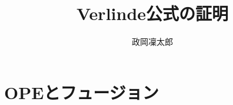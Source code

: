 \documentclass{jlreq}
\begin{document}
\title{Verlinde公式の証明}
\author{政岡凜太郎}
\maketitle


\section{OPEとフュージョン}

\end{document}
